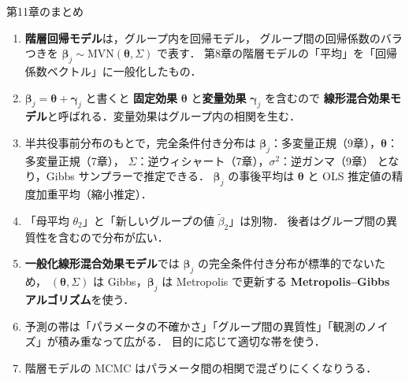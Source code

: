 \documentclass[lualatex,ja=standard,a4paper,12pt]{bxjsarticle}
\newcommand{\mvn}{\mathrm{MVN}}
\begin{document}
\begin{thmbox}{第11章のまとめ}
\begin{enumerate}
  \item \textbf{階層回帰モデル}は，グループ内を回帰モデル，
        グループ間の回帰係数のバラつきを $\bm{\beta}_j \sim \mvn(\bm{\theta}, \Sigma)$ で表す．
        第8章の階層モデルの「平均」を「回帰係数ベクトル」に一般化したもの．

  \item $\bm{\beta}_j = \bm{\theta} + \bm{\gamma}_j$ と書くと
        \textbf{固定効果} $\bm{\theta}$ と\textbf{変量効果} $\bm{\gamma}_j$ を含むので
        \textbf{線形混合効果モデル}と呼ばれる．変量効果はグループ内の相関を生む．

  \item 半共役事前分布のもとで，完全条件付き分布は
        $\bm{\beta}_j$：多変量正規（9章），$\bm{\theta}$：多変量正規（7章），
        $\Sigma$：逆ウィシャート（7章），$\sigma^2$：逆ガンマ（9章）
        となり，Gibbs サンプラーで推定できる．
        $\bm{\beta}_j$ の事後平均は $\bm{\theta}$ と OLS 推定値の精度加重平均（縮小推定）．

  \item 「母平均 $\theta_2$」と「新しいグループの値 $\tilde{\beta}_2$」は別物．
        後者はグループ間の異質性を含むので分布が広い．

  \item \textbf{一般化線形混合効果モデル}では $\bm{\beta}_j$ の完全条件付き分布が標準的でないため，
        $(\bm{\theta}, \Sigma)$ は Gibbs，$\bm{\beta}_j$ は Metropolis で更新する
        \textbf{Metropolis--Gibbs アルゴリズム}を使う．

  \item 予測の帯は「パラメータの不確かさ」「グループ間の異質性」「観測のノイズ」が積み重なって広がる．
        目的に応じて適切な帯を使う．

  \item 階層モデルの MCMC はパラメータ間の相関で混ざりにくくなりうる．
\end{enumerate}
\end{thmbox}
\end{document}
